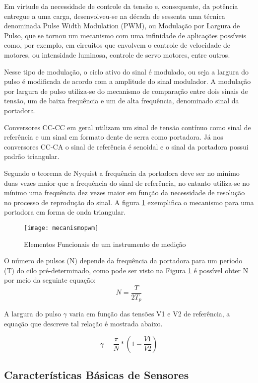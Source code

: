 			Em virtude da necessidade de controle da tensão e, consequente, da potência entregue a uma carga, desenvolveu-se na década de sessenta uma técnica denominada Pulse Width Modulation (PWM), ou Modulação por Largura de Pulso, que se tornou um mecanismo com uma infinidade de aplicações possíveis como, por exemplo, em circuitos que envolvem o controle de velocidade de motores, ou intensidade luminosa, controle de servo motores, entre outros.
			
			Nesse tipo de modulação, o ciclo ativo do sinal é modulado, ou seja a largura do pulso é modificada de acordo com a amplitude do sinal modulador. A modulação por largura de pulso utiliza-se do mecanismo de comparação entre dois sinais de tensão, um de baixa frequência e um de alta frequência, denominado sinal da portadora. 
			
			Conversores CC-CC em geral utilizam um sinal de tensão contínuo como sinal de referência e um sinal em formato dente de serra como portadora. Já nos conversores CC-CA o sinal de referência é senoidal e o sinal da portadora possui padrão triangular.

			Segundo o teorema de Nyquist a frequência da portadora deve ser no mínimo duas vezes maior que a frequência do sinal de referência, no entanto utiliza-se no mínimo uma frequência dez vezes maior em função da necessidade de resolução no processo de reprodução do sinal. A figura \ref{mecanismopwm} exemplifica o mecanismo para uma portadora em forma de onda triangular.

			\newpage
			\begin{figure}[!h]
				\centering
				\texttt{[image: mecanismopwm]}
				\caption{Elementos Funcionais de um instrumento de medição}
				\label{mecanismopwm}
			\end{figure}

			O número de pulsos (N) depende da frequência da portadora para um período (T) do cilo pré-determinado, como pode ser visto na Figura \ref{mecanismopwm} é possível obter N por meio da seguinte equação:
													$$ N = \frac{T}{2T_p} $$
													
			A largura do pulso $\gamma$ varia em função das tensões V1 e V2 de referência, a equação que descreve tal relação é mostrada abaixo.

			$$ \gamma = \frac{\pi}{N}*\left(1 - \frac{V1}{V2}\right) $$


		\subsection{Características Básicas de Sensores}

